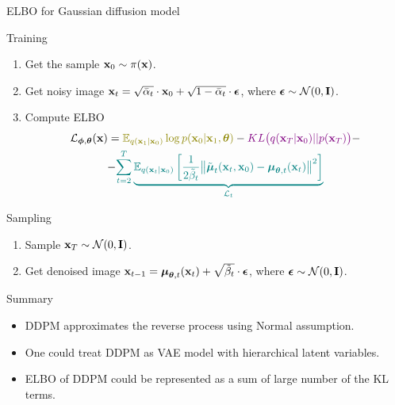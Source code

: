\begin{frame}{ELBO for Gaussian diffusion model}
	\begin{block}{Training}
		\begin{enumerate}
			\item Get the sample $\mathbf{x}_0 \sim \pi(\mathbf{x})$.
			\item Get noisy image $\mathbf{x}_t = \sqrt{\bar{\alpha}_t} \cdot \mathbf{x}_0 + \sqrt{1 - \bar{\alpha}_t} \cdot \boldsymbol{\epsilon}$, where $\boldsymbol{\epsilon} \sim \mathcal{N}(0, \mathbf{I})$.
			\item Compute ELBO 
			\vspace{-0.3cm}
			\begin{multline*}
				\cL_{\bphi, \btheta}(\bx) =  {\color{olive}\bbE_{q(\bx_1 | \bx_0)} \log p(\bx_0 | \bx_1, \btheta)} - {\color{violet}KL\bigl(q(\bx_T | \bx_0) || p(\bx_T)\bigr)} - \\
				- {\color{teal}\sum_{t=2}^T \underbrace{ \bbE_{q(\bx_t | \bx_0)} \left[\frac{1}{2\tilde{\beta}_t} \bigl\| \tilde{\bmu}_t(\bx_t, \bx_0) - \bmu_{\btheta, t}(\bx_t) \bigr\|^2  \right]}_{\cL_t}}
			\end{multline*}
			\vspace{-0.7cm}
		\end{enumerate}
	\end{block}
	\begin{block}{Sampling}
		\begin{enumerate}
			\item Sample $\mathbf{x}_T \sim \mathcal{N}(0, \mathbf{I})$.
			\item Get denoised image $\mathbf{x}_{t - 1} = \boldsymbol{\mu}_{\boldsymbol{\theta}, t}(\mathbf{x}_t) +  \sqrt{\tilde{\beta}_t} \cdot \boldsymbol{\epsilon}$, where $\boldsymbol{\epsilon} \sim \mathcal{N}(0, \mathbf{I})$.
		\end{enumerate}
	\end{block}
	
\end{frame}
\begin{frame}{Summary}
	\begin{itemize}
		\item DDPM approximates the reverse process using Normal assumption.		
		\vfill
		\item One could treat DDPM as VAE model with hierarchical latent variables.
		\vfill
		\item ELBO of DDPM could be represented as a sum of large number of the KL terms.
	\end{itemize}
\end{frame}
 